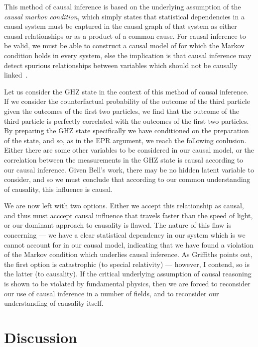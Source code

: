 \documentclass[11pt, a4paper]{article}
\begin{document}
This method of causal inference is based on the underlying assumption of the 
\textit{causal markov condition}, which simply states that statistical
dependencies in a causal system must be captured in the causal graph of that
system as either causal relationships or as a product of a common cause. For
causal inference to be valid, we must be able to construct a causal model of
for which the Markov condition holds in every system, else the implication is
that causal inference may detect spurious relationships between variables which
should not be causally linked~\cite{Geiger_1990}.

Let us consider the GHZ state in the context of this method of causal inference.
If we consider the counterfactual probability of the outcome of the third
particle given the outcomes of the first two particles, we find that the outcome
of the third particle is perfectly correlated with the outcomes of the first two
particles. By preparing the GHZ state specifically we have conditioned on the 
preparation of the state, and so, as in the EPR argument, we reach the following
conlusion. Either there are some other variables to be considered in our causal
model, or the correlation between the measurements in the GHZ state is causal
according to our causal inference. Given Bell's work, there may be no hidden 
latent variable to consider, and so we must conclude that according to our
common understanding of causality, this influence is causal.

We are now left with two options. Either we accept this relationship as causal,
and thus must acccept causal influence that travels faster than the speed of
light, or our dominant approach to causality is flawed. The nature of this flaw
is concerning — we have a clear statistical dependency in our system which is
we cannot account for in our causal model, indicating that we have found a
violation of the Markov condition which underlies causal inference.
As Griffiths points out, the first option is catastrophic
(to special relativity) — however, I contend, so is the latter (to causality).
If the critical underlying assumption of causal reasoning is shown to be
violated by fundamental physics, then we are forced to reconsider our use of 
causal inference in a number of fields, and to reconsider our understanding of
causality itself.

\section{Discussion}
\end{document}
